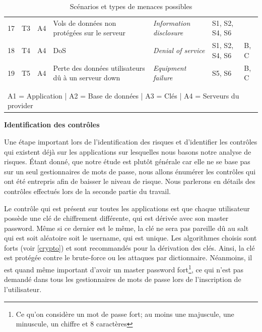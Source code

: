 \begin{table}[H]
{\begin{tabular}{cccllll}
			17 & T3   & A4           & Vols de données non protégées sur le serveur                                                                                  & \textit{Information disclosure} & S1, S2, S4, S6   &         \\
			18 & T4   & A4           & DoS                                                                                                                           & \textit{Denial of service}           & S1, S2, S4, S6   & B, C   		\\
			19 & T5   & A4           & Perte des données utilisateurs dû à un serveur down                                                                                                                           & \textit{Equipment failure}           & S5, S6   & B, C   	\\
			\\\\	\hline 
			\multicolumn{7}{l}{A1 = Application | A2 = Base de données | A3 = Clés | A4 = Serveurs du provider}\\ \hline
	\end{tabular}}
\caption{Scénarios et types de menaces possibles \label{4.3}}
\end{table}

\textbf{Identification des contrôles}\label{contrôles}

Une étape important lors de l'identification des risques et d'identifier les contrôles qui existent déjà sur les applications sur lesquelles nous basons notre analyse de risques. Étant donné, que notre étude est plutôt générale car elle ne se base pas sur un seul gestionnaires de mots de passe, nous allons énumérer les contrôles qui ont été entrepris afin de baisser le niveau de risque. Nous parlerons en détails des contrôles effectués lors de la seconde partie du travail.

Le contrôle qui est présent sur toutes les applications est que chaque utilisateur possède une clé de chiffrement différente, qui est dérivée avec son master password. Même si ce dernier est le même, la clé ne sera pas pareille dû au salt qui est soit aléatoire soit le username, qui est unique. Les algorithmes choisis sont forts (voir \ref{crypto}) et sont recommandés pour la dérivation des clés. Ainsi, la clé est protégée contre le brute-force ou les attaques par dictionnaire. Néanmoins, il est quand même important d'avoir un master password fort\footnote{Ce qu'on considère un mot de passe fort; au moins une majuscule, une minuscule, un chiffre et 8 caractères}, ce qui n'est pas demandé dans tous les gestionnaires de mots de passe lors de l'inscription de l'utilisateur.


